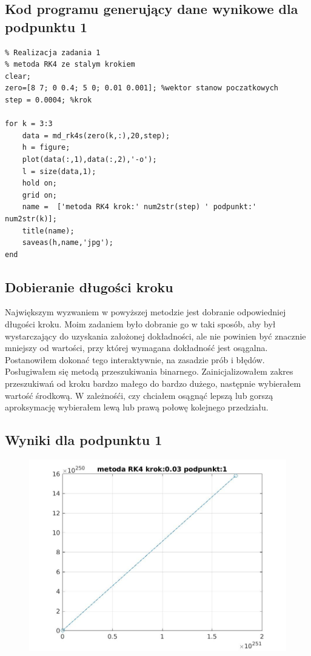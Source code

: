 \documentclass[a4paper, 11pt]{article}
\begin{document}
\subsection{Kod programu generujący dane wynikowe dla podpunktu 1}
\begin{lstlisting}
% Realizacja zadania 1 
% metoda RK4 ze stalym krokiem
clear; 
zero=[8 7; 0 0.4; 5 0; 0.01 0.001]; %wektor stanow poczatkowych
step = 0.0004; %krok

for k = 3:3
    data = md_rk4s(zero(k,:),20,step);
    h = figure;
    plot(data(:,1),data(:,2),'-o');
    l = size(data,1);
    hold on;
    grid on;
    name =  ['metoda RK4 krok:' num2str(step) ' podpunkt:' num2str(k)]; 
    title(name);
    saveas(h,name,'jpg');
end
\end{lstlisting}

\subsection{Dobieranie długości kroku}
Największym wyzwaniem w powyższej metodzie jest dobranie odpowiedniej długości kroku. Moim zadaniem było dobranie go w taki sposób, aby był wystarczający do uzyskania założonej dokładności, ale nie powinien być znacznie mniejszy od wartości, przy której wymagana dokładność jest osągalna. \\
Postanowiłem dokonać tego interaktywnie, na zasadzie prób i błędów. Posługiwałem się metodą przeszukiwania binarnego. Zainicjalizowałem zakres przeszukiwań od kroku bardzo małego do bardzo dużego, następnie wybierałem wartość środkową. W zależnośći, czy chciałem osągnąć lepszą lub gorszą aproksymację wybierałem lewą lub prawą połowę kolejnego przedziału.


\subsection{Wyniki dla podpunktu 1}
\begin{figure}[H]
\centering
\includegraphics[width = 15cm]{2d/metoda RK4 krok:0,03 podpunkt:1.jpg}
\end{figure}
\end{document}
